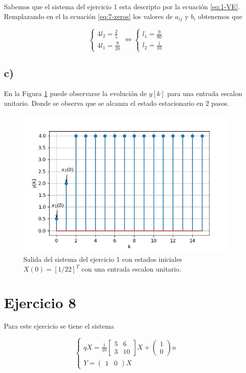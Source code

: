 \documentclass[11pt,a4paper]{article}
\newcommand{\siseq}[1]{ \left\{ \begin{array}{c}
    #1
\end{array} \right. }
\begin{document}
   Sabemos que el sistema del ejercicio 1 esta descripto por la ecuación \ref{eq:1-VE}. Remplazando en 
   el la ecuación \ref{eq:7-zeros} los valores de $a_{ij}$ y $b_i$ obtenemos que 

   \begin{equation}
       \siseq{
           4l_2 = \frac{2}{5} \\ 
           4l_1 = \frac{9}{20}
       }
       \Leftrightarrow
       \siseq{
           l_1 = \frac{9}{80} \\ 
           l_2 = \frac{1}{10}
       }
   \end{equation}


   \subsection*{c)}

   En la Figura \ref{fig:7-c} puede observarse la evolución de $y[k]$ para una entrada escalon unitario.
   Donde se observa que se alcanza el estado estacionario en $2$ pasos. 

   \begin{figure}
       \centering
       \includegraphics[width=.7\textwidth]{Img/7-c.jpg}
       \caption{Salida del sistema del ejercicio 1 con estados iniciales $X(0)=[1/2 2]^T$ con una entrada escalon unitario.}
       \label{fig:7-c}
   \end{figure}

    \section*{Ejercicio 8}

       Para este ejercicio se tiene el sistema 
       
       \begin{equation}
           \siseq{
               qX = 
               \frac{1}{10}
               \begin{bmatrix}
                   5 & 6 \\
                   3 & 10
               \end{bmatrix} X +
               \begin{pmatrix}
                   1 \\ 0
               \end{pmatrix} u \\ 
               Y = 
               \begin{pmatrix}
                   1 & 0
               \end{pmatrix} X
           }
       \end{equation}
\end{document}
